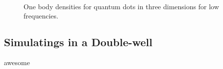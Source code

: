 \begin{figure}
\begin{center}
     \\
  \caption{One body densities for quantum dots in three dimensions for low frequencies.}
  \label{fig:OBD_QDOTS3D_lowfreq}
 \end{center}
\end{figure}



\subsection{Simulatings in a Double-well}

awesome